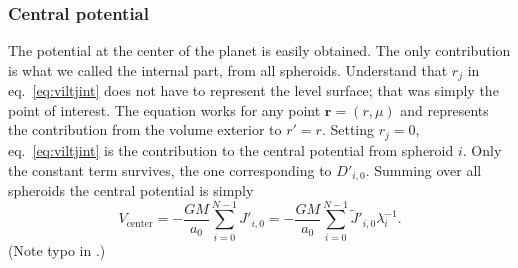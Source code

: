 \documentclass[amsmath,amsfonts,rmp,letterpaper]{revtex4}
\newcommand{\V}[1]{\mathbf{#1}} %
\newcommand{\sub}[1]{_{\text{#1}}} %
\newcommand{\arr}{\V{r}}
\newcommand{\Jtil}{\widetilde{J}}
\begin{document}
\subsubsection{Central potential}

The potential at the center of the planet is easily obtained. The only
contribution is what we called the internal part, from all spheroids. Understand
that $r_j$ in eq.~\eqref{eq:viltjint} does not have to represent the level
surface; that was simply the point of interest. The equation works for any point
$\arr=(r,\mu)$ and represents the contribution from the volume exterior to $r'=r$.
Setting $r_j=0$, eq.~\eqref{eq:viltjint} is the contribution to the central
potential from spheroid $i$. Only the constant term survives, the one
corresponding to $D'_{i,0}$. Summing over all spheroids the central potential is
simply
\begin{equation}\label{eq:central_V}
V\sub{center} = -\frac{GM}{a_0}\sum_{i=0}^{N-1}J'_{i,0} =
-\frac{GM}{a_0}\sum_{i=0}^{N-1}\Jtil'_{i,0}\lambda_i^{-1}.
\end{equation}
(Note typo in \citep{Hubbard2013}.)



\end{document}
